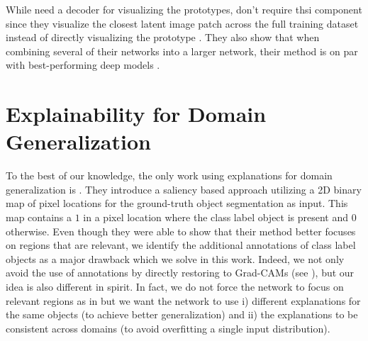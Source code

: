 While \citet{LiLCR18} need a decoder for visualizing the prototypes, \citet{ChenLTBRS19} don't require thsi component since they visualize the closest latent image patch across the full training dataset instead of directly visualizing the prototype \citep{ChenLTBRS19}. They also show that when combining several of their networks into a larger network, their method is on par with best-performing deep models \citep{ChenLTBRS19}.


\section{Explainability for Domain Generalization}

To the best of our knowledge, the only work using explanations for domain generalization is \citet{zunino2020explainable}.
They introduce a saliency based approach utilizing a 2D binary map of pixel locations for the ground-truth object segmentation as input. This map contains a $1$ in a pixel location where the class label object is present and $0$ otherwise. Even though they were able to show that their method better focuses on regions that are relevant, we identify the additional annotations of class label objects as a major drawback which we solve in this work. Indeed, we not only avoid the use of annotations by directly restoring to Grad-CAMs (see ), but our idea is also different in spirit. In fact, we do not force the network to focus on relevant regions as in \cite{zunino2020explainable} but we want the network to use i) different explanations for the same objects (to achieve better generalization) and ii) the explanations to be consistent across domains (to avoid overfitting a single input distribution).